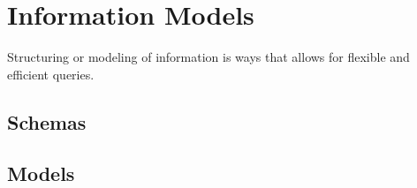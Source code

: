 


\section{Information Models}

Structuring or modeling of information is ways that allows for flexible and efficient queries.

\subsection{Schemas}

\subsection{Models}


